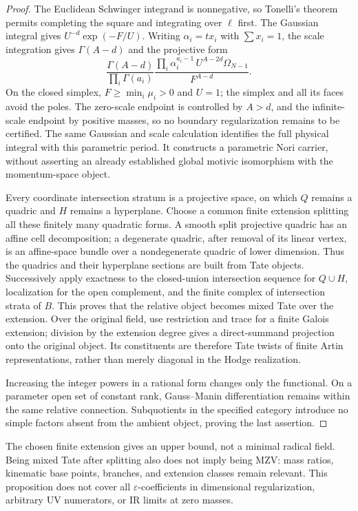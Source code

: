 \documentclass[11pt,a4paper,oneside]{article}
\theoremstyle{plain}
\theoremstyle{definition}
\theoremstyle{remark}
\numberwithin{equation}{section}
\begin{document}
\begin{proof}
The Euclidean Schwinger integrand is nonnegative, so Tonelli's theorem permits completing the square and integrating over $\ell$ first.
The Gaussian integral gives $U^{-d}\exp(-F/U)$. Writing $\alpha_i=t x_i$ with $\sum x_i=1$,
the scale integration gives $\Gamma(A-d)$ and the projective form
\[
 \frac{\Gamma(A-d)}{\prod_i\Gamma(a_i)}
 \frac{\prod_i\alpha_i^{a_i-1}\,U^{A-2d}\Omega_{N-1}}{F^{A-d}}.
\]
On the closed simplex, $F\ge\min_i\mu_i>0$ and $U=1$;
the simplex and all its faces avoid the poles. The zero-scale endpoint is controlled by $A>d$,
and the infinite-scale endpoint by positive masses, so no boundary regularization remains to be certified.
The same Gaussian and scale calculation identifies the full physical integral with this parametric period.
It constructs a parametric Nori carrier, without asserting an already established global motivic isomorphism with the momentum-space object.

Every coordinate intersection stratum is a projective space, on which $Q$ remains a quadric and $H$ remains a hyperplane.
Choose a common finite extension splitting all these finitely many quadratic forms.
A smooth split projective quadric has an affine cell decomposition;
a degenerate quadric, after removal of its linear vertex, is an affine-space bundle over a nondegenerate quadric of lower dimension.
Thus the quadrics and their hyperplane sections are built from Tate objects.
Successively apply exactness to the closed-union intersection sequence for $Q\cup H$, localization for the open complement, and the finite complex of intersection strata of $B$.
This proves that the relative object becomes mixed Tate over the extension.
Over the original field, use restriction and trace for a finite Galois extension; division by the extension degree gives a direct-summand projection onto the original object.
Its constituents are therefore Tate twists of finite Artin representations, rather than merely diagonal in the Hodge realization.

Increasing the integer powers in a rational form changes only the functional. On a parameter open set of constant rank,
Gauss--Manin differentiation remains within the same relative connection.
Subquotients in the specified category introduce no simple factors absent from the ambient object, proving the last assertion.
\end{proof}

The chosen finite extension gives an upper bound, not a minimal radical field.
Being mixed Tate after splitting also does not imply being MZV: mass ratios, kinematic base points, branches, and extension classes remain relevant.
This proposition does not cover all $\varepsilon$-coefficients in dimensional regularization, arbitrary UV numerators, or IR limits at zero masses.
\end{document}
